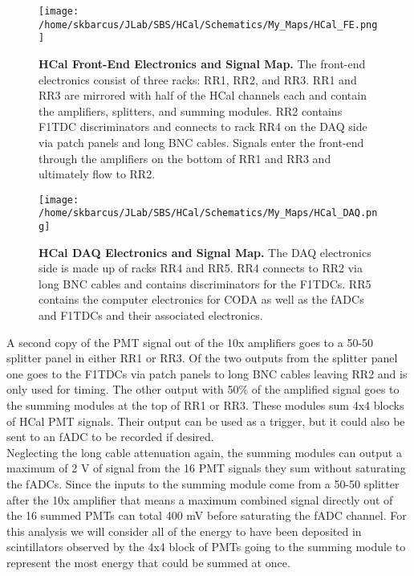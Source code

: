 \documentclass[10pt]{article}
\begin{document}
	\begin{figure}[!ht]
	\begin{center}
	\texttt{[image: /home/skbarcus/JLab/SBS/HCal/Schematics/My\_Maps/HCal\_FE.png]}
	\end{center}
	\caption{
	{\bf{HCal Front-End Electronics and Signal Map.}} The front-end electronics consist of three racks: RR1, RR2, and RR3. RR1 and RR3 are mirrored with half of the HCal channels each and contain the amplifiers, splitters, and summing modules. RR2 contains F1TDC discriminators and connects to rack RR4 on the DAQ side via patch panels and long BNC cables. Signals enter the front-end through the amplifiers on the bottom of RR1 and RR3 and ultimately flow to RR2.}
	\label{fig:FE}
	\end{figure}	
	
	\begin{figure}[!ht]
	\begin{center}
	\texttt{[image: /home/skbarcus/JLab/SBS/HCal/Schematics/My\_Maps/HCal\_DAQ.png]}
	\end{center}
	\caption{
	{\bf{HCal DAQ Electronics and Signal Map.}} The DAQ electronics side is made up of racks RR4 and RR5. RR4 connects to RR2 via long BNC cables and contains discriminators for the F1TDCs. RR5 contains the computer electronics for CODA as well as the fADCs and F1TDCs and their associated electronics.}
	\label{fig:DAQ}
	\end{figure}		
	
	A second copy of the PMT signal out of the 10x amplifiers goes to a 50-50 splitter panel in either RR1 or RR3. Of the two outputs from the splitter panel one goes to the F1TDCs via patch panels to long BNC cables leaving RR2 and is only used for timing. The other output with 50\% of the amplified signal goes to the summing modules at the top of RR1 or RR3. These modules sum 4x4 blocks of HCal PMT signals. Their output can be used as a trigger, but it could also be sent to an fADC to be recorded if desired.\\
	
	 Neglecting the long cable attenuation again, the summing modules can output a maximum of 2 V of signal from the 16 PMT signals they sum without saturating the fADCs. Since the inputs to the summing module come from a 50-50 splitter after the 10x amplifier that means a maximum combined signal directly out of the 16 summed PMTs can total 400 mV before saturating the fADC channel. For this analysis we will consider all of the energy to have been deposited in scintillators observed by the 4x4 block of PMTs going to the summing module to represent the most energy that could be summed at once.\\ 
	
\end{document}

